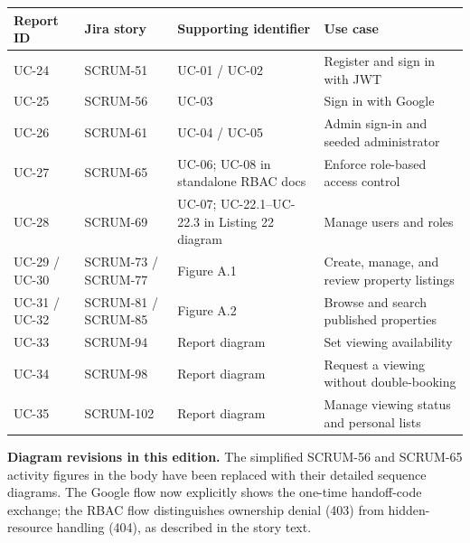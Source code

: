 \documentclass[11pt,a4paper]{article}
\begin{document}
\small
\renewcommand{\arraystretch}{1.16}
\begin{tabularx}{\textwidth}{@{}p{1.5cm}p{2.3cm}p{5.5cm}X@{}}
\toprule
Report ID & Jira story & Supporting identifier & Use case \\
\midrule
UC-24 & SCRUM-51 & UC-01 / UC-02 & Register and sign in with JWT \\
UC-25 & SCRUM-56 & UC-03 & Sign in with Google \\
UC-26 & SCRUM-61 & UC-04 / UC-05 & Admin sign-in and seeded administrator \\
UC-27 & SCRUM-65 & UC-06; UC-08 in standalone RBAC docs & Enforce role-based access control \\
UC-28 & SCRUM-69 & UC-07; UC-22.1--UC-22.3 in Listing 22 diagram & Manage users and roles \\
UC-29 / UC-30 & SCRUM-73 / SCRUM-77 & Figure A.1 & Create, manage, and review property listings \\
UC-31 / UC-32 & SCRUM-81 / SCRUM-85 & Figure A.2 & Browse and search published properties \\
UC-33 & SCRUM-94 & Report diagram & Set viewing availability \\
UC-34 & SCRUM-98 & Report diagram & Request a viewing without double-booking \\
UC-35 & SCRUM-102 & Report diagram & Manage viewing status and personal lists \\
\bottomrule
\end{tabularx}
\normalsize

\textbf{Diagram revisions in this edition.} The simplified SCRUM-56 and SCRUM-65 activity figures in the body have been replaced with their detailed sequence diagrams. The Google flow now explicitly shows the one-time handoff-code exchange; the RBAC flow distinguishes ownership denial (403) from hidden-resource handling (404), as described in the story text.
\end{document}
